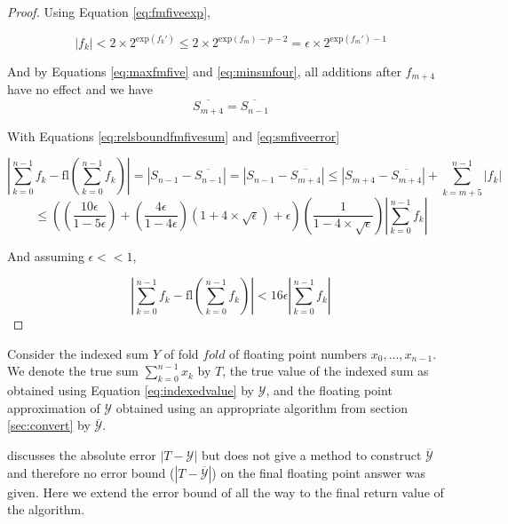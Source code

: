 \documentclass[12pt]{article}
\providecommand{\exp}{\ensuremath{\text{exp}}}
\providecommand{\fl}{\ensuremath{\text{fl}}}
\theoremstyle{plain}
\numberwithin{equation}{section}
\begin{document}
\begin{proof}
        Using Equation \ref{eq:fmfiveexp},

        \begin{equation}
          |f_k| < 2 \times 2^{\exp(f_k')} \leq 2 \times 2^{\exp(f_m) - p - 2} = \epsilon \times 2^{\exp(f_m') - 1}
          \label{eq:maxfmfive}
        \end{equation}

        And by Equations \ref{eq:maxfmfive} and \ref{eq:minsmfour}, all additions after $f_{m + 4}$ have no effect and we have
        \begin{equation}
          \overline{S_{m + 4}} = \overline{S_{n - 1}}
          \label{eq:smfourcontinues}
        \end{equation}

        With Equations \ref{eq:relsboundfmfivesum} and \ref{eq:smfiveerror}

        \begin{equation*}
          |\sum \limits_{k = 0}^{n - 1} f_k - \fl(\sum \limits_{k = 0}^{n - 1} f_k)| = |S_{n - 1} - \overline{S_{n - 1}}| = |S_{n - 1} - \overline{S_{m + 4}}| \leq |S_{m + 4} - \overline{S_{m + 4}}| + \sum\limits_{k = m + 5}^{n - 1}|f_k|
        \end{equation*}
        \begin{equation*}
          \leq ((\frac{10\epsilon}{1 - 5 \epsilon}) + (\frac{4\epsilon}{1 - 4 \epsilon})(1 + 4 \times \sqrt\epsilon) + \epsilon)(\frac{1}{1 - 4 \times \sqrt\epsilon})|\sum\limits_{k = 0}^{n - 1}f_k|
        \end{equation*}

        And assuming $\epsilon << 1$,

        \begin{equation}
          |\sum \limits_{k = 0}^{n - 1} f_k - \fl(\sum \limits_{k = 0}^{n - 1} f_k)| < 16\epsilon|\sum\limits_{k = 0}^{n - 1}f_k|
          \label{eq:sortsum_finalbound}
        \end{equation}
    \end{proof}
    Consider the indexed sum $Y$ of fold $fold$ of floating point numbers $x_0, ..., x_{n - 1}$. We denote the true sum $\sum \limits_{k = 0}^{n - 1} x_k$ by $T$, the true value of the indexed sum as obtained using Equation \ref{eq:indexedvalue} by $\mathcal{Y}$, and the floating point approximation of $\mathcal{Y}$ obtained using an appropriate algorithm from section \ref{sec:convert} by $\overline{\mathcal{Y}}$.

    \cite{repsum} discusses the absolute error $|T - \mathcal{Y}|$ but does not give a method to construct $\overline{\mathcal{Y}}$ and therefore no error bound ($|T - \overline{\mathcal{Y}}|$) on the final floating point answer was given. Here we extend the error bound of \cite{repsum} all the way to the final return value of the algorithm.
\end{document}
